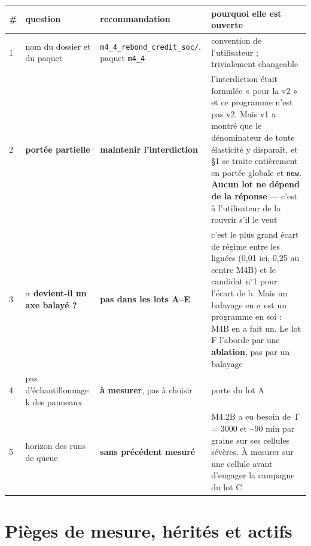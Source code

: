 \documentclass[11pt,a4paper]{article}
\newcommand{\code}[1]{\texttt{#1}}
\providecommand{\degree}{\ensuremath{^\circ}}
\begin{document}
\begin{center}
\begin{tabularx}{\linewidth}{@{}lXXX@{}}
\toprule
\textbf{\#} & \textbf{question} & \textbf{recommandation} & \textbf{pourquoi elle est ouverte} \\
\midrule
1 & nom du dossier et du paquet & \code{m4\_4\_rebond\_credit\_soc/}, paquet \code{m4\_4} & convention de l'utilisateur ; trivialement changeable \\
2 & \textbf{portée partielle} & \textbf{maintenir l'interdiction} & l'interdiction était formulée « pour la v2 » et ce programme n'est pas v2. Mais v1 a montré que le dénominateur de toute élasticité y disparaît, et §1 se traite entièrement en portée globale et \code{new}. \textbf{Aucun lot ne dépend de la réponse} --- c'est à l'utilisateur de la rouvrir s'il le veut \\
3 & \textbf{\ensuremath{\sigma} devient-il un axe balayé ?} & \textbf{pas dans les lots A--E} & c'est le plus grand écart de régime entre les lignées (0,01 ici, 0,25 au centre M4B) et le candidat n\degree{}1 pour l'écart de b. Mais un balayage en \ensuremath{\sigma} est un programme en soi : M4B en a fait un. Le lot F l'aborde par une \textbf{ablation}, pas par un balayage \\
4 & pas d'échantillonnage k des panneaux & \textbf{à mesurer}, pas à choisir & porte du lot A \\
5 & horizon des runs de queue & \textbf{sans précédent mesuré} & M4.2B a eu besoin de T = 3000 et \textasciitilde{}90 min par graine sur ses cellules sévères. À mesurer sur une cellule avant d'engager la campagne du lot C \\
\bottomrule
\end{tabularx}
\end{center}

\bigskip

\setcounter{section}{8}
\section{Pièges de mesure, hérités et actifs}
\end{document}
